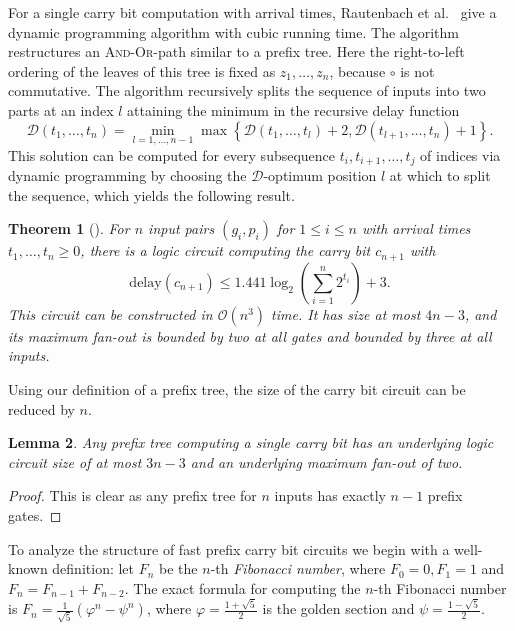 \documentclass[11pt,final,microtype]{scrartcl}
\theoremstyle{plain}
\newtheorem{theorem}{Theorem}[section]
\newtheorem{lemma}[theorem]{Lemma}
\theoremstyle{definition}
\theoremstyle{remark}
\newcommand{\ld}{\log_{2}}
\newcommand{\delay}{\mathrm{delay}}
\begin{document}
For a single carry bit computation with arrival times, Rautenbach et
al.\ \cite{bonn1} give a dynamic programming algorithm with cubic
running time.  The algorithm restructures an \textsc{And-Or}-path
similar to a prefix tree. Here the right-to-left ordering of the
leaves of this tree is fixed as $z_1, \dots, z_n$, because $\circ$ is
not commutative. The algorithm recursively splits the sequence of
inputs into two parts at an index $l$ attaining the minimum in the
recursive delay function
\begin{equation}
\mathcal{D}(t_1, \dots, t_n) = \min_{l=1, \dots,
  n-1} \max \left\{\mathcal{D}(t_1, \dots, t_l) +2,
  \mathcal{D}(t_{l+1}, \dots, t_n) + 1\right\}.
\label{eqn:bl-dp}
\end{equation}
This solution can be computed for every subsequence $t_i, t_{i+1}, \dots, t_j$ of indices
via dynamic programming by choosing the $\mathcal{D}$-optimum position
$l$ at which to split the sequence, which yields the following
result. 
\begin{theorem}[{\cite{bonn1}}] \label{thm:bl-main} For $n$ input pairs $(g_i, p_i)$ for $1 \leq i \leq n$
  with arrival times $t_1, \dots, t_n \geq 0$, there is a logic circuit computing the carry bit $c_{n+1}$ with
\begin{equation} \delay(c_{n+1}) \leq 1.441
  \ld \left(\sum_{i=1}^n 2^{t_i}\right) + 3.
  \label{eqn:bl-delay-bound}
\end{equation} This circuit can be
  constructed in $\mathcal{O}(n^3)$ time. It has size at most $4n -
  3$, and its maximum fan-out is bounded by two at all gates and
  bounded by three at all inputs.
\end{theorem}
Using our definition of a prefix tree, the size of the carry bit circuit can be reduced by $n$.
\begin{lemma} \label{lem:small-bl} Any prefix tree computing a single
  carry bit has an underlying  logic circuit  size of at most $3n-3$ and an underlying 
  maximum fan-out of two.
\end{lemma} 
\begin{proof}
  This is clear as any   prefix tree for $n$ inputs  has exactly $n-1$ prefix gates. 
\end{proof}
To analyze the structure of fast prefix carry bit circuits we
begin with a well-known definition: let $F_n$ be the $n$-th
\emph{Fibonacci number}, where $F_0 = 0, F_1 = 1$ and $F_n = F_{n-1} +
F_{n-2}$. The exact formula for computing the $n$-th Fibonacci number
is $F_n = \frac{1}{\sqrt{5}} (\varphi^n - \psi^n)$, where $\varphi =
\frac{1+ \sqrt{5}}{2}$ is the golden section and $\psi =
\frac{1-\sqrt{5}}{2}$.
\end{document}
